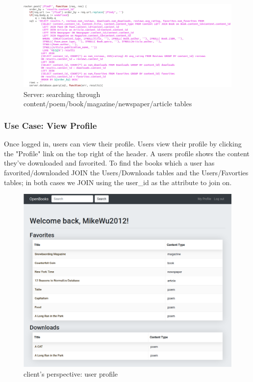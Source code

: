\documentclass[letter, 12pt, titlepage]{article}
\begin{document}
	\begin{figure}[h!]
		\includegraphics[scale=0.40]{search-code.png}
		\caption{Server: searching through content/poem/book/magazine/newspaper/article tables}
	\end{figure}

\newpage

	
	\subsubsection{Use Case: View Profile}
Once logged in, users can view their profile. Users view their profile by clicking the "Profile" link on the top right of the header. A users profile shows the content they've downloaded and favorited. To find the books which a user has favorited/downloaded JOIN the Users/Downloads tables and the Users/Favorties tables; in both cases we JOIN using the user\_id as the attribute to join on.

	\begin{figure}[h!]
		\centering
		\includegraphics[scale=0.40]{profile.png}
		\caption{client's perspective: user profile}
	\end{figure}
\end{document}
